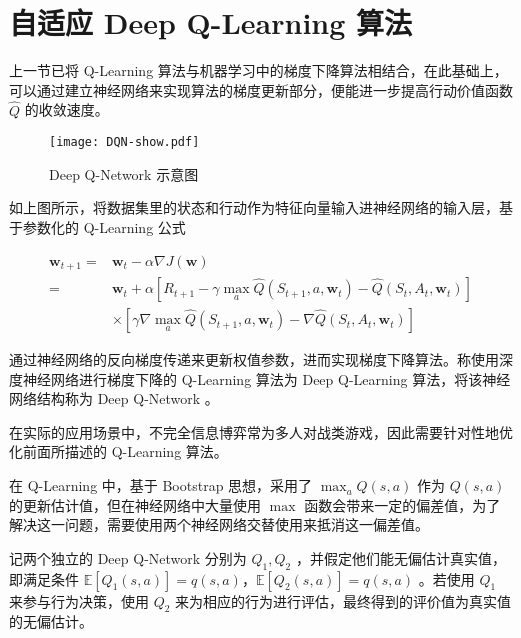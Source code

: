 \section{自适应 Deep Q-Learning 算法}

上一节已将 Q-Learning 算法与机器学习中的梯度下降算法相结合，在此基础上，可以通过建立神经网络来实现算法的梯度更新部分\cite{hecht1992theory}，便能进一步提高行动价值函数 $\widehat{Q}$ 的收敛速度。

\begin{figure}[H]
    \centering
    \texttt{[image: DQN-show.pdf]}
    \caption{Deep Q-Network 示意图}
\end{figure}

如上图所示，将数据集里的状态和行动作为特征向量输入进神经网络的输入层，基于参数化的 Q-Learning 公式

\begin{equation}
\begin{aligned} \boldsymbol{w}_{t+1} =&\boldsymbol{w}_{t}-\alpha\nabla J(\boldsymbol{w}) \\ =&\boldsymbol{w}_{t}+\alpha\left[R_{t+1} - \gamma \max _{a} \widehat{Q}\left(S_{t+1}, a, \boldsymbol{w}_{t}\right)-\widehat{Q}\left(S_{t}, A_{t}, \boldsymbol{w}_{t}\right)\right]\\&\times\left[\gamma\nabla \max _{a} \widehat{Q}\left(S_{t+1}, a, \boldsymbol{w}_{t}\right)-\nabla \widehat{Q}\left(S_{t}, A_{t}, \boldsymbol{w}_{t}\right)\right] \end{aligned}
\end{equation}

通过神经网络的反向梯度传递来更新权值参数，进而实现梯度下降算法\cite{hecht1992theory}。称使用深度神经网络进行梯度下降的 Q-Learning 算法为 Deep Q-Learning 算法，将该神经网络结构称为 Deep Q-Network 。

在实际的应用场景中，不完全信息博弈常为多人对战类游戏，因此需要针对性地优化前面所描述的 Q-Learning 算法。

在 Q-Learning 中，基于 Bootstrap 思想，采用了 $\max_aQ(s,a)$ 作为 $Q(s,a)$ 的更新估计值，但在神经网络中大量使用 $\max$ 函数会带来一定的偏差值，为了解决这一问题，需要使用两个神经网络交替使用来抵消这一偏差值。

\begin{Theorem}\label{the:doubledqn}
    记两个独立的 Deep Q-Network 分别为 $Q_1,Q_2$ ，并假定他们能无偏估计真实值，即满足条件 $\mathbb{E}\left[Q_1(s,a)\right] = q(s,a)$，$\mathbb{E}\left[Q_2(s,a)\right] = q(s,a)$ 。若使用 $Q_1$ 来参与行为决策，使用 $Q_2$ 来为相应的行为进行评估，最终得到的评价值为真实值的无偏估计。
\end{Theorem}

